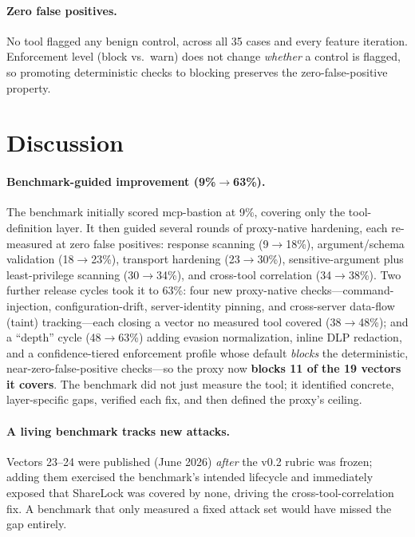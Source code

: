 \documentclass[sigconf,review]{acmart}
\begin{document}
\paragraph{Zero false positives.} No tool flagged any benign control, across all 35 cases and every feature iteration. Enforcement level (block vs.\ warn) does not change \emph{whether} a control is flagged, so promoting deterministic checks to blocking preserves the zero-false-positive property.

\section{Discussion}\label{sec:discussion}
\paragraph{Benchmark-guided improvement (9\%$\rightarrow$63\%).} The benchmark initially scored mcp-bastion at 9\%, covering only the tool-definition layer. It then guided several rounds of proxy-native hardening, each re-measured at zero false positives: response scanning (9$\rightarrow$18\%), argument/schema validation (18$\rightarrow$23\%), transport hardening (23$\rightarrow$30\%), sensitive-argument plus least-privilege scanning (30$\rightarrow$34\%), and cross-tool correlation (34$\rightarrow$38\%). Two further release cycles took it to 63\%: four new proxy-native checks---command-injection, configuration-drift, server-identity pinning, and cross-server data-flow (taint) tracking---each closing a vector no measured tool covered (38$\rightarrow$48\%); and a ``depth'' cycle (48$\rightarrow$63\%) adding evasion normalization, inline DLP redaction, and a confidence-tiered enforcement profile whose default \emph{blocks} the deterministic, near-zero-false-positive checks---so the proxy now \textbf{blocks 11 of the 19 vectors it covers}. The benchmark did not just measure the tool; it identified concrete, layer-specific gaps, verified each fix, and then defined the proxy's ceiling.

\paragraph{A living benchmark tracks new attacks.} Vectors 23--24 were published (June 2026) \emph{after} the v0.2 rubric was frozen; adding them exercised the benchmark's intended lifecycle and immediately exposed that ShareLock was covered by none, driving the cross-tool-correlation fix. A benchmark that only measured a fixed attack set would have missed the gap entirely.
\end{document}
